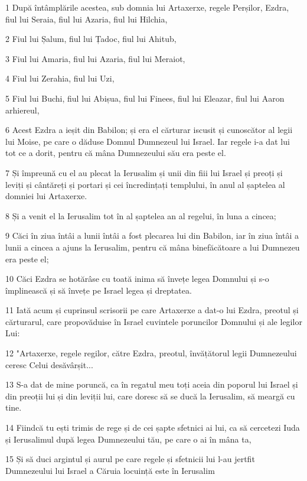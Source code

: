 \par 1 După întâmplările acestea, sub domnia lui Artaxerxe, regele Perșilor, Ezdra, fiul lui Seraia, fiul lui Azaria, fiul lui Hilchia,
\par 2 Fiul lui Șalum, fiul lui Țadoc, fiul lui Ahitub,
\par 3 Fiul lui Amaria, fiul lui Azaria, fiul lui Meraiot,
\par 4 Fiul lui Zerahia, fiul lui Uzi,
\par 5 Fiul lui Buchi, fiul lui Abișua, fiul lui Finees, fiul lui Eleazar, fiul lui Aaron arhiereul,
\par 6 Acest Ezdra a ieșit din Babilon; și era el cărturar iscusit și cunoscător al legii lui Moise, pe care o dăduse Domnul Dumnezeul lui Israel. Iar regele i-a dat lui tot ce a dorit, pentru că mâna Dumnezeului său era peste el.
\par 7 Și împreună cu el au plecat la Ierusalim și unii din fiii lui Israel și preoți și leviți și cântăreți și portari și cei încredințați templului, în anul al șaptelea al domniei lui Artaxerxe.
\par 8 Și a venit el la Ierusalim tot în al șaptelea an al regelui, în luna a cincea;
\par 9 Căci în ziua întâi a lunii întâi a fost plecarea lui din Babilon, iar în ziua întâi a lunii a cincea a ajuns la Ierusalim, pentru că mâna binefăcătoare a lui Dumnezeu era peste el;
\par 10 Căci Ezdra se hotărâse cu toată inima să învețe legea Domnului și s-o împlinească și să învețe pe Israel legea și dreptatea.
\par 11 Iată acum și cuprinsul scrisorii pe care Artaxerxe a dat-o lui Ezdra, preotul și cărturarul, care propovăduise în Israel cuvintele poruncilor Domnului și ale legilor Lui:
\par 12 "Artaxerxe, regele regilor, către Ezdra, preotul, învățătorul legii Dumnezeului ceresc Celui desăvârșit...
\par 13 S-a dat de mine poruncă, ca în regatul meu toți aceia din poporul lui Israel și din preoții lui și din leviții lui, care doresc să se ducă la Ierusalim, să meargă cu tine.
\par 14 Fiindcă tu ești trimis de rege și de cei șapte sfetnici ai lui, ca să cercetezi Iuda și Ierusalimul după legea Dumnezeului tău, pe care o ai în mâna ta,
\par 15 Și să duci argintul și aurul pe care regele și sfetnicii lui l-au jertfit Dumnezeului lui Israel a Căruia locuință este în Ierusalim
